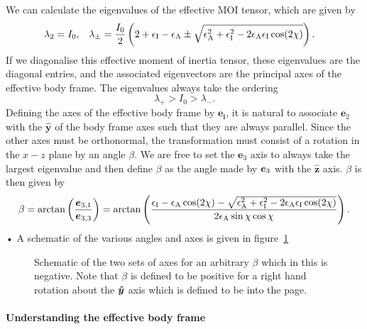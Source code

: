 \documentclass[../full_thesis/full_thesis.tex]{subfiles}
\newcommand{\thisdir}{../rotating_frame}
\begin{document}
We can calculate the eigenvalues of the effective MOI tensor, which are given by
\begin{align}
\lambda_{2}=I_{0}, &&&
\lambda_{\pm}=\frac{I_{0}}{2}
\left(2+\epsilon_{\mathrm{I}}-\epsilon_{\mathrm{A}}\pm
\sqrt{\epsilon_{\mathrm{A}}^{2}+\epsilon_{\mathrm{I}}^{2}-2\epsilon_{\mathrm{A}}\epsilon_{\mathrm{I}}\cos(2\chi)}\right).
\end{align}
If we diagonalise this effective moment of inertia tensor, these eigenvalues
are the diagonal entries, and the associated eigenvectors are the principal
axes of the effective body frame. The eigenvalues always take the ordering
\begin{equation}
\lambda_{+}>I_{0}>\lambda_{-}.
\end{equation}
Defining the axes of the effective body frame by $\boldsymbol{e_{i}}$, it is natural to
associate $\boldsymbol{e}_{2}$ with the
$\boldsymbol{\hat{y}}$ of the body frame axes such that they are always
parallel. Since the other axes must be orthonormal, the transformation must
consist of a rotation in the $x-z$ plane by an angle $\beta$. We are
free to set the $\boldsymbol{e}_{3}$ axis to always take the largest eigenvalue
and then define $\beta$ as the angle made by $\boldsymbol{e}_{3}$ with the
$\hat{\boldsymbol{z}}$ axis. $\beta$ is then given by
\begin{equation}
\beta = \arctan\left(\frac{\boldsymbol{e}_{3,1}}{\boldsymbol{e}_{3,3}}\right)
=\arctan\left( \frac{ \epsilon_{\mathrm{I}}-\epsilon_{\mathrm{A}}\cos(2\chi)-
              \sqrt{\epsilon_{\mathrm{A}}^{2}+\epsilon_{\mathrm{I}}^{2}-2\epsilon_{\mathrm{A}}\epsilon_{\mathrm{I}}\cos(2\chi)}}
              {2\epsilon_{\mathrm{A}}\sin\chi \cos\chi}\right).
\label{eqn: beta}
\end{equation}•
A schematic of the various angles and axes is given in
figure~\ref{fig: schematic}
\begin{figure}[ht]
\centering
 
\caption{Schematic of the two sets of axes for an arbitrary $\beta$ which in this
is negative. Note that
$\beta$ is defined to be positive for a right hand rotation about the $\boldsymbol{\hat{y}}$ axis
which is defined to be into the page.}
\label{fig: schematic}
\end{figure}

\paragraph{Understanding the effective body frame}
\end{document}
